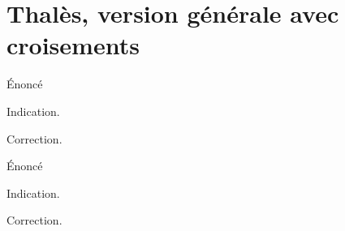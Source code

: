 \section{Thalès, version générale avec croisements}

\begin{exo}
Énoncé
\begin{hint}
Indication.
\end{hint}
\begin{sol}
Correction.
\end{sol}
\end{exo}

\begin{exo}
Énoncé
\begin{hint}
Indication.
\end{hint}
\begin{sol}
Correction.
\end{sol}
\end{exo}


